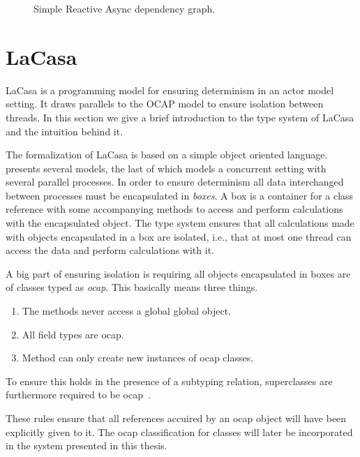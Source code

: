 \begin{figure}
  \centering
  \caption{Simple Reactive Async dependency graph.}
  \label{fig:ra_example}
\end{figure}

\section{LaCasa}\label{sec:lacasa}

LaCasa\parencite{conf/oopsla/HallerL16} is a programming model for ensuring
determinism in an actor model\parencite{actormodelref} setting. It draws
parallels to the OCAP model to ensure isolation between threads.  In this
section we give a brief introduction to the type system of LaCasa and the
intuition behind it.

The formalization of LaCasa is based on a simple object oriented language.
\textcite{conf/oopsla/HallerL16} presents several models, the last of which
models a concurrent setting with several parallel processes. In order to ensure
determinism all data interchanged between processes must be encapsulated in
\emph{boxes}. A box is a container for a class reference with some accompanying
methods to access and perform calculations with the encapsulated object. The
type system ensures that all calculations made with objects encapsulated in a box
are isolated, i.e., that at most one thread can access the data and perform
calculations with it.

A big part of ensuring isolation is requiring all objects encapsulated in boxes
are of classes typed as \emph{ocap}. This basically means three things.
\begin{enumerate}
  \item The methods never access a global global object.
  \item All field types are ocap.
  \item Method can only create new instances of ocap classes.
\end{enumerate}
To ensure this holds in the presence of a subtyping relation, superclasses are
furthermore required to be ocap~\parencite{conf/oopsla/HallerL16}.

These rules ensure that all references accuired by an ocap object will have been
explicitly given to it. The ocap classification for classes will later be
incorporated in the system presented in this thesis.

